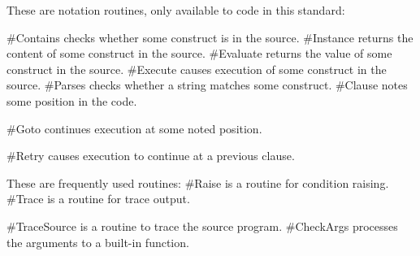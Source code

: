 These are notation routines, only available to code in this standard:

\#Contains checks whether some construct is in the source. \#Instance
returns the content of some construct in the source. \#Evaluate returns
the value of some construct in the source. \#Execute causes execution of
some construct in the source. \#Parses checks whether a string matches
some construct. \#Clause notes some position in the code.

\#Goto continues execution at some noted position.

\#Retry causes execution to continue at a previous clause.

These are frequently used routines: \#Raise is a routine for condition
raising. \#Trace is a routine for trace output.

\#TraceSource is a routine to trace the source program. \#CheckArgs
processes the arguments to a built-in function.
